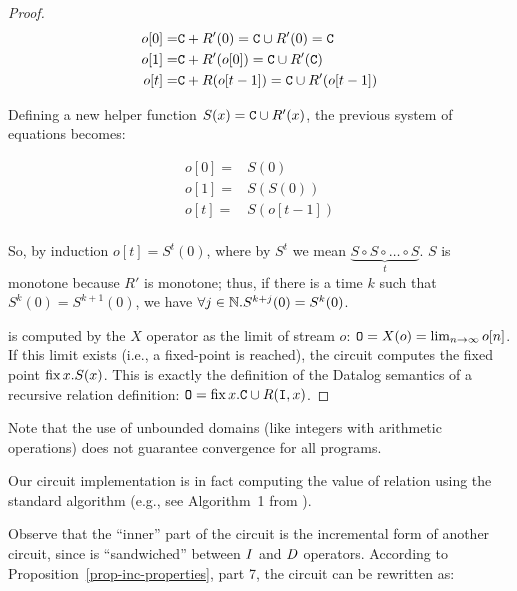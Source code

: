 \begin{proof}
$$
\begin{aligned}
o[0] =& \mbox{\texttt{C}} + R'(0) = \mbox{\texttt{C}} \cup R'(0) = \mbox{\texttt{C}} \\
o[1] =& \mbox{\texttt{C}} + R'(o[0]) = \mbox{\texttt{C}} \cup R'(\mbox{\texttt{C}}) \\
o[t] =& \mbox{\texttt{C}} + R(o[t-1]) = \mbox{\texttt{C}} \cup R'(o[t-1]) \\
\end{aligned}
$$

Defining a new helper function $S(x) = \mbox{\texttt{C}} \cup R'(x)$, the previous system of equations becomes:

$$
\begin{aligned}
o[0] =& S(0) \\
o[1] =& S(S(0)) \\
o[t] =& S(o[t-1]) \\
\end{aligned}
$$

So, by induction $o[t] = S^t(0)$, where by $S^t$ we mean $\underbrace{S \circ S \circ \ldots \circ S}_{t}$.
$S$ is monotone because $R'$ is monotone; thus, if there is a time $k$ such that $S^k(0) = S^{k+1}(0)$, we have
$\forall j \in \mathbb{N} . S^{k+j}(0) = S^k(0)$.

 is computed by the $X$ operator as the limit of stream $o$:
$\mbox{\texttt{O}} = X(o) = \lim_{n \to \infty} o[n]$.  If this limit exists (i.e., a fixed-point
is reached), the circuit computes the fixed point $\mbox{fix}\,x.S(x)$.  This is exactly
the definition of the Datalog semantics of a recursive relation definition: $\mbox{\texttt{O}} =
\mbox{fix}\,x.\mbox{\texttt{C}} \cup R(\mbox{\texttt{I}}, x)$.
\end{proof}

Note that the use of unbounded domains (like integers with arithmetic operations) does
not guarantee convergence for all programs.

Our circuit implementation is in fact computing the value of relation  using the standard
 algorithm (e.g., see Algorithm~1 from \cite{greco-sldm15}).

Observe that the ``inner'' part of the circuit is the incremental
form of another circuit, since is ``sandwiched'' between $\mathit{I}$ and $\mathit{D}$ operators.
According to Proposition~\ref{prop-inc-properties}, part 7, the circuit can be
rewritten as:

